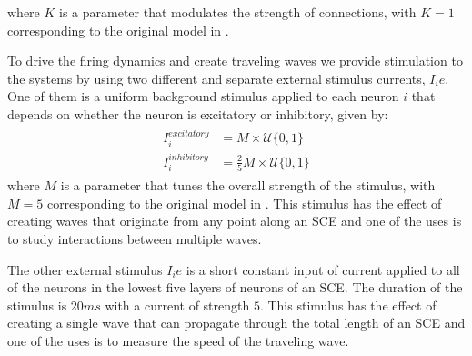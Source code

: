 \documentclass[a4paper,11pt]{article}
\begin{document}
where $K$ is a parameter that modulates the strength of connections, with $K=1$ corresponding to the original model in \cite{izhikevich2003}.

To drive the firing dynamics and create traveling waves we provide stimulation to the systems by using two different and separate external stimulus currents, $I_ie$. 
One of them is a uniform background stimulus applied to each neuron $i$ that depends on whether the neuron is excitatory or inhibitory, given by:
\begin{align}
 \begin{split}
  I_i^{excitatory} &= M \times \mathcal{U}\{0,1 \} \\
  I_i^{inhibitory} &= \frac{2}{5} M \times \mathcal{U}\{0,1 \}
 \end{split}
\end{align}
where $M$ is a parameter that tunes the overall strength of the stimulus, with $M=5$ corresponding to the original model in \cite{izhikevich2003}. 
This stimulus has the effect of creating waves that originate from any point along an SCE and one of the uses is to study interactions between multiple waves.

The other external stimulus $I_ie$ is a short constant input of current applied to all of the neurons in the lowest five layers of neurons of an SCE. 
The duration of the stimulus is $20 ms$ with a current of strength $5$. 
This stimulus has the effect of creating a single wave that can propagate through the total length of an SCE and one of the uses is to measure the speed of the traveling wave.
\end{document}
